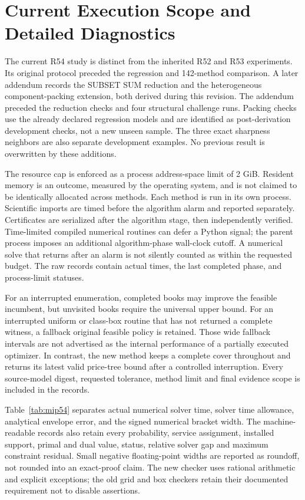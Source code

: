 \section{Current Execution Scope and Detailed Diagnostics}\label{sec:diagnostics54}
The current R54 study is distinct from the inherited R52 and R53 experiments. Its original protocol preceded the regression and 142-method comparison. A later addendum records the SUBSET SUM reduction and the heterogeneous component-packing extension, both derived during this revision. The addendum preceded the reduction checks and four structural challenge runs. Packing checks use the already declared regression models and are identified as post-derivation development checks, not a new unseen sample. The three exact sharpness neighbors are also separate development examples. No previous result is overwritten by these additions.

The resource cap is enforced as a process address-space limit of 2 GiB. Resident memory is an outcome, measured by the operating system, and is not claimed to be identically allocated across methods. Each method is run in its own process. Scientific imports are timed before the algorithm alarm and reported separately. Certificates are serialized after the algorithm stage, then independently verified. Time-limited compiled numerical routines can defer a Python signal; the parent process imposes an additional algorithm-phase wall-clock cutoff. A numerical solve that returns after an alarm is not silently counted as within the requested budget. The raw records contain actual times, the last completed phase, and process-limit statuses.

For an interrupted enumeration, completed books may improve the feasible incumbent, but unvisited books require the universal upper bound. For an interrupted uniform or class-box routine that has not returned a complete witness, a fallback original feasible policy is retained. Those wide fallback intervals are not advertised as the internal performance of a partially executed optimizer. In contrast, the new method keeps a complete cover throughout and returns its latest valid price-tree bound after a controlled interruption. Every source-model digest, requested tolerance, method limit and final evidence scope is included in the records.

Table~\ref{tab:mip54} separates actual numerical solver time, solver time allowance, analytical envelope error, and the signed numerical bracket width. The machine-readable records also retain every probability, service assignment, installed support, primal and dual value, status, relative solver gap and maximum constraint residual. Small negative floating-point widths are reported as roundoff, not rounded into an exact-proof claim. The new checker uses rational arithmetic and explicit exceptions; the old grid and box checkers retain their documented requirement not to disable assertions.

